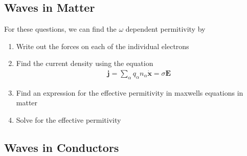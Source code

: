 \subsection{Waves in Matter}
For these questions, we can find the $\omega$ dependent permitivity by
\begin{enumerate}
\item Write out the forces on each of the individual electrons
\item Find the current density using the equation
\begin{align}
\textbf{j} = \sum_\alpha q_\alpha  n_\alpha \dot{\textbf{x}} = \sigma\textbf{E}
\end{align}
\item Find an expression for the effective permitivity in maxwells equations in matter
\item Solve for the effective permitivity
 
\end{enumerate}





\subsection{Waves in Conductors}

